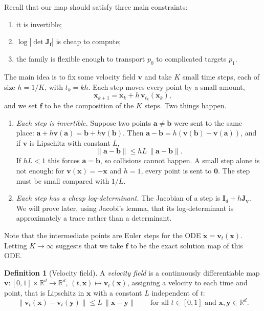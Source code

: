 \documentclass[11pt,a4paper]{article}
\numberwithin{equation}{section}     %
\theoremstyle{plain}        %
\theoremstyle{definition}   %
\newtheorem{definition}[theorem]{Definition}
\theoremstyle{remark}       %
\begin{document}
Recall that our map should satisfy three main constraints:
\begin{enumerate}
\item it is invertible;
\item $\log\left|\det\mathbf{J}_{\mathbf{f}}\right|$ is cheap to compute;
\item the family is flexible enough to transport $p_0$ to complicated targets $p_1$.
\end{enumerate}

The main idea is to fix some velocity field $\mathbf{v}$ and take $K$ small time steps, each of size $h=1/K$, with $t_k=kh$. Each step moves every point by a small amount,
\[
\mathbf{x}_{k+1}=\mathbf{x}_k+h\,\mathbf{v}_{t_k}(\mathbf{x}_k),
\]
and we set $\mathbf{f}$ to be the composition of the $K$ steps. Two things happen.
\begin{enumerate}
\item \emph{Each step is invertible.} Suppose two points $\mathbf{a}\neq\mathbf{b}$ were sent to the same place: $\mathbf{a}+h\mathbf{v}(\mathbf{a})=\mathbf{b}+h\mathbf{v}(\mathbf{b})$. Then $\mathbf{a}-\mathbf{b}=h\left(\mathbf{v}(\mathbf{b})-\mathbf{v}(\mathbf{a})\right)$, and if $\mathbf{v}$ is Lipschitz with constant $L$,
\[
\|\mathbf{a}-\mathbf{b}\|\le hL\,\|\mathbf{a}-\mathbf{b}\| .
\]
If $hL<1$ this forces $\mathbf{a}=\mathbf{b}$, so collisions cannot happen. A small step alone is not enough: for $\mathbf{v}(\mathbf{x})=-\mathbf{x}$ and $h=1$, every point is sent to $\mathbf{0}$. The step must be small compared with $1/L$.
\item \emph{Each step has a cheap log-determinant.} The Jacobian of a step is $\mathbf{I}_d+h\mathbf{J}_{\mathbf{v}}$. We will prove later, using Jacobi's lemma, that its log-determinant is approximately a trace rather than a determinant.
\end{enumerate}
Note that the intermediate points are Euler steps for the ODE $\dot{\mathbf{x}}=\mathbf{v}_t(\mathbf{x})$. Letting $K\to\infty$ suggests that we take $\mathbf{f}$ to be the exact solution map of this ODE.

\begin{definition}[Velocity field]\label{def:vfield}
A \emph{velocity field} is a continuously differentiable map $\mathbf{v}:[0,1]\times\mathbb{R}^d\to\mathbb{R}^d$, $(t,\mathbf{x})\mapsto\mathbf{v}_t(\mathbf{x})$, assigning a velocity to each time and point, that is Lipschitz in $\mathbf{x}$ with a constant $L$ independent of $t$:
\[
\|\mathbf{v}_t(\mathbf{x})-\mathbf{v}_t(\mathbf{y})\|\le L\,\|\mathbf{x}-\mathbf{y}\|\qquad\text{for all }t\in[0,1]\text{ and }\mathbf{x},\mathbf{y}\in\mathbb{R}^d .
\]
\end{definition}
\end{document}
